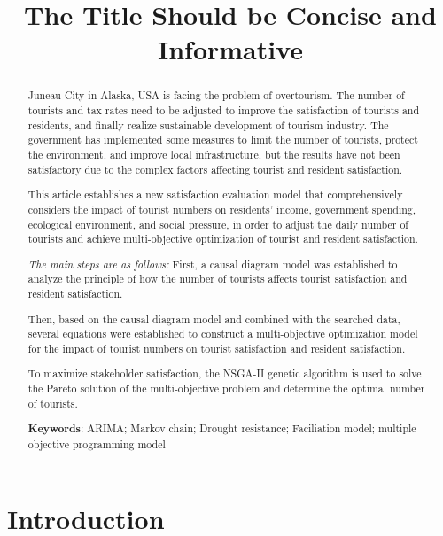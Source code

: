 \documentclass[12pt]{article}  %
\title{The Title Should be Concise and Informative}  %
\begin{document}
 
 \begin{abstract}
Juneau City in Alaska, USA is facing the problem of overtourism. The number of tourists and tax rates need to be adjusted to improve the satisfaction of tourists and residents, and finally realize sustainable development of tourism industry. The government has implemented some measures to limit the number of tourists, protect the environment, and improve local infrastructure, but the results have not been satisfactory due to the complex factors affecting tourist and resident satisfaction.
     
This article establishes a new satisfaction evaluation model that comprehensively considers the impact of tourist numbers on residents' income, government spending, ecological environment, and social pressure, in order to adjust the daily number of tourists and achieve multi-objective optimization of tourist and resident satisfaction.

\textit{The main steps are as follows:}
 First, a causal diagram model was established to analyze the principle of how the number of tourists affects tourist satisfaction and resident satisfaction.

 Then, based on the causal diagram model and combined with the searched data, several equations were established to construct a multi-objective optimization model for the impact of tourist numbers on tourist satisfaction and resident satisfaction.

 To maximize stakeholder satisfaction, the NSGA-II genetic algorithm is used to solve the Pareto solution of the multi-objective problem and determine the optimal number of tourists.
 
 
     \vspace{5pt}  %
     \textbf{Keywords}: ARIMA; Markov chain; Drought resistance; Faciliation model; multiple objective programming model
 
 \end{abstract}
 
 \maketitle  %
 
 \tableofcontents  %
 
 
 \section{Introduction}
 
\end{document}
